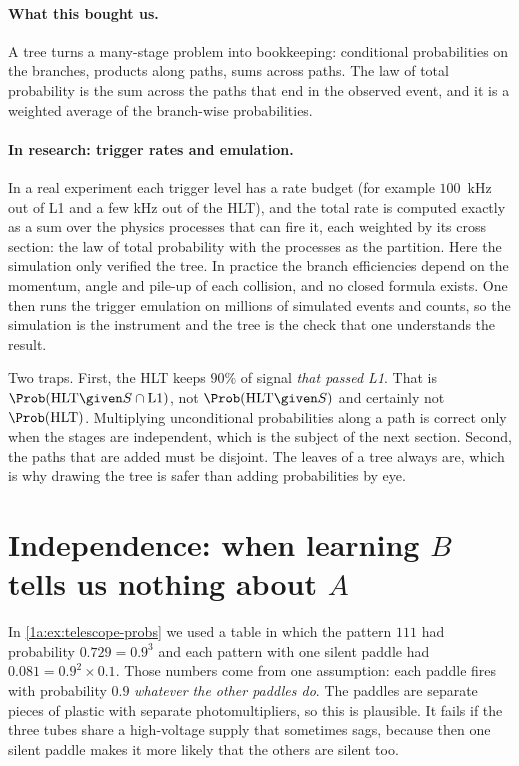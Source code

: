\paragraph{What this bought us.}
A tree turns a many-stage problem into bookkeeping: conditional probabilities
on the branches, products along paths, sums across paths. The law of total
probability is the sum across the paths that end in the observed event, and
it is a weighted average of the branch-wise probabilities.

\paragraph{In research: trigger rates and emulation.}
In a real experiment each trigger level has a rate budget (for example
$100$~kHz out of L1 and a few kHz out of the HLT), and the total rate is computed
exactly as a sum over the physics processes that can fire it, each weighted by
its cross section: the law of total probability with the processes as the
partition. Here the simulation only verified the tree. In practice the
branch efficiencies depend on the momentum, angle and pile-up of each
collision, and no closed formula exists. One then runs the trigger emulation
on millions of simulated events and counts, so the simulation is the
instrument and the tree is the check that one understands the result.

\begin{pitfall}
Two traps. First, the HLT keeps $90\%$ of signal \emph{that passed L1}. That is
$\Prob(\mathrm{HLT}\given S\cap\mathrm{L1})$, not $\Prob(\mathrm{HLT}\given S)$ and certainly not
$\Prob(\mathrm{HLT})$. Multiplying unconditional probabilities along a path is correct
only when the stages are independent, which is the subject of the next section.
Second, the paths that are added must be disjoint. The leaves of a tree always
are, which is why drawing the tree is safer than adding probabilities by eye.
\end{pitfall}

\section{Independence: when learning $B$ tells us nothing about $A$}
\label{1a:sec:independence}

In \cref{1a:ex:telescope-probs} we used a table in which the pattern $111$ had
probability $0.729=0.9^3$ and each pattern with one silent paddle had
$0.081=0.9^2\times0.1$. Those numbers come from one assumption: each paddle fires
with probability $0.9$ \emph{whatever the other paddles do}. The paddles are
separate pieces of plastic with separate photomultipliers, so this is
plausible. It fails if the three tubes share a high-voltage supply that
sometimes sags, because then one silent paddle makes it more likely that the
others are silent too.

